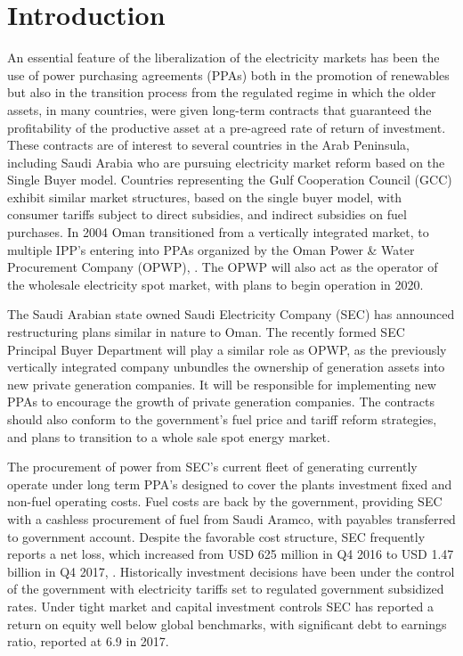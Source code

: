 \documentclass[informs]{informs3}
\begin{document}

\section{Introduction}\label{Introduction}
An essential feature of the liberalization of the electricity markets has been the use of power purchasing agreements (PPAs) both in the promotion of renewables but also in the transition process from the regulated regime in which the older assets, in many countries, were given long-term contracts that guaranteed the profitability of the productive asset at a pre-agreed rate of return of investment. These contracts are of interest to several countries in the Arab Peninsula, including Saudi Arabia who are pursuing electricity market reform based on the Single Buyer model. Countries representing the Gulf Cooperation Council (GCC) exhibit similar market structures, based on the single buyer model, with consumer tariffs subject to direct subsidies, and indirect subsidies on fuel purchases. In 2004 Oman transitioned from a vertically integrated market, to multiple IPP’s entering into PPAs organized by the Oman Power \& Water Procurement Company (OPWP), \cite{Albadi_2017}. The OPWP will also act as the operator of the wholesale electricity spot market, with plans to begin operation in 2020. 


The Saudi Arabian state owned Saudi Electricity Company (SEC) has announced restructuring plans similar in nature to Oman. The recently formed SEC Principal Buyer Department will play a similar role as OPWP, as the previously vertically integrated company unbundles the ownership of generation assets into new private generation companies. It will be responsible for implementing new PPAs to encourage the growth of private generation companies. The contracts should also conform to the government’s fuel price and tariff reform strategies, and plans to transition to a whole sale spot energy market. 

The procurement of power from SEC’s current fleet of generating currently operate under long term PPA’s designed to cover the plants investment fixed and non-fuel operating costs. Fuel costs are back by the government, providing SEC with a cashless procurement of fuel from Saudi Aramco, with payables transferred to government account. Despite the favorable cost structure, SEC frequently reports a net loss, which increased from USD 625 million in Q4 2016 to USD 1.47 billion in Q4 2017, \cite{Falcom_2018}. Historically investment decisions have been under the control of the government with electricity tariffs set to regulated government subsidized rates. Under tight market and capital investment controls SEC has reported a return on equity well below global benchmarks, with significant debt to earnings ratio, reported at 6.9 in 2017.
\end{document}
